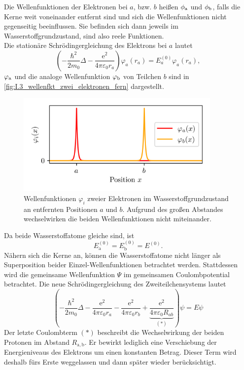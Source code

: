     Die Wellenfunktionen der Elektronen bei $a$, bzw. $b$ heißen $\phi_\text a$ und $\phi_\text b$, falls die Kerne weit voneinander entfernt sind und sich die Wellenfunktionen nicht gegenseitig beeinflussen.
    Sie befinden sich dann jeweils im Wasserstoffgrundzustand, sind also reele Funktionen.\\
    Die stationäre Schrödingergleichung des Elektrons bei $a$ lautet
    \begin{equation}
        \label{eq:3.1}
        \left( - \frac{\hbar ^2}{2m_0} \Delta - \frac{ \mathrm{e}^2}{4 \pi \varepsilon_0 r_{a}} \right) \varphi_{a} \left( r_{a} \right) = E_{a}^{(0)} \varphi_{a}\left( r_{a} \right),
    \end{equation} 
    $\varphi_\text a$ und die analoge Wellenfunktion $\varphi_\text b$ von Teilchen $b$ sind in \autoref{fig:I.3_wellenfkt_zwei_elektronen_fern} dargestellt.\\
    \begin{figure}[H]
        \centering
        \includegraphics[width=10cm]{figures/vl04/wavefn_two_electrons.png}
        \caption{Wellenfunktionen $\varphi_i$ zweier Elektronen im Wasserstoffgrundzustand an entfernten Positionen $a$ und $b$. Aufgrund des großen Abstandes wechselwirken die beiden Wellenfunktionen nicht miteinander.}
        \label{fig:I.3_wellenfkt_zwei_elektronen_fern}
    \end{figure}

    Da beide Wasserstoffatome gleiche sind, ist
    \begin{equation}
        \label{eq:3.2}
        E_\mathrm{a}^{(0)} = E_\mathrm{b}^{(0)} = E^{(0)}.
    \end{equation}
    Nähern sich die Kerne an, können die Wasserstoffatome nicht länger als Superposition beider Einzel-Wellenfunktionen betrachtet werden.
    Stattdessen wird die gemeinsame Wellenfunktion $\Psi$ im gemeinsamen Coulombpotential betrachtet. Die neue Schrödingergleichung des Zweiteilchensystems lautet
    \begin{equation}
        \label{eq:3.3}
        \left( - \frac{\hbar ^2}{2 m_0} \Delta - \frac{\mathrm{e}^2}{4 \pi \varepsilon_0 r_{a}} -\frac{\mathrm{e}^2}{4 \pi \varepsilon_0 r_{b}} + \underbrace{\frac{\mathrm{e}^2}{4 \pi \varepsilon_0 R_{ab}}}_{(*)} \right) \psi = E \psi
    \end{equation}
    Der letzte Coulombterm $(*)$ beschreibt die Wechselwirkung der beiden Protonen im Abstand $R_\mathrm{a,b}$.
    Er bewirkt lediglich eine Verschiebung der Energieniveaus des Elektrons um einen konstanten Betrag. 
    Dieser Term wird deshalb fürs Erste weggelassen und dann später wieder berücksichtigt.\\

